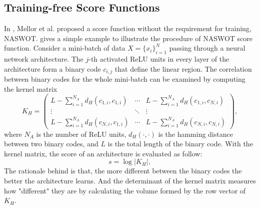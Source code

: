 \documentclass[sigconf]{acmart}
\begin{document}
    \subsection{Training-free Score Functions}
    In \cite{https://doi.org/10.48550/arxiv.2006.04647}, Mellor et al. 
    proposed a score function without the requirement for training, NASWOT. 
     gives a simple example 
    to illustrate the procedure of NASWOT score function. Consider a 
    mini-batch of data $X=\{x_i\}^N_{i=1}$ passing through a neural network 
    architecture. The $j$-th activated ReLU units in every layer of the architecture 
    form a binary code $c_{i,j}$ that define the linear region. The correlation 
    between binary codes for the whole mini-batch can be examined by computing 
    the kernel matrix 
    \begin{equation}
        K_H=\begin{pmatrix}L-\sum_{i=1}^{N_A}d_H(c_{1,i},c_{1,i})&\cdots&L-\sum_{i=1}^{N_A}d_H(c_{1,i},c_{N,i})\\\vdots&\ddots&\vdots\\L-\sum_{i=1}^{N_A}d_H(c_{N,i},c_{1,i})&\cdots&L-\sum_{i=1}^{N_A}d_H(c_{N,i},c_{N,i})\end{pmatrix},
    \end{equation}
    where $N_A$ is the number of ReLU units, $d_H(\cdot,\cdot)$ is the hamming 
    distance between two binary codes, and $L$ is the total length of the binary 
    code. With the kernel matrix, the score of an architecture is evaluated as 
    follow: 
    \begin{equation}
        s=\log\lvert K_H\rvert,
    \end{equation}
    The rationale behind is that, the more different between the binary codes 
    the better the architecture learns. And the determinant of the kernel matrix 
    measures how "different" they are by calculating the volume formed by the 
    row vector of $K_H$. 
\end{document}
